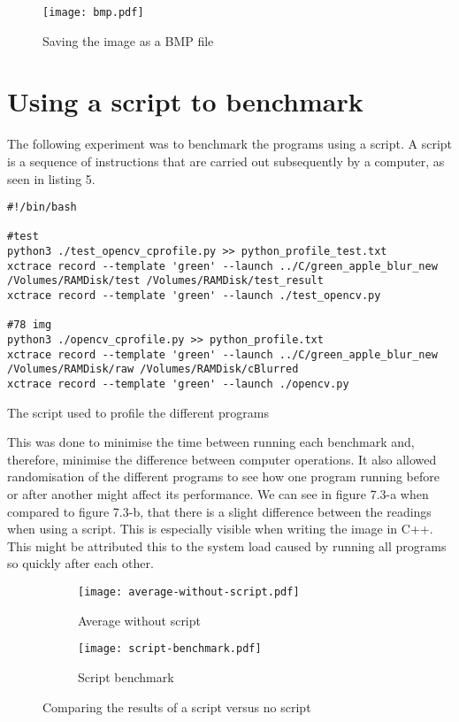 \begin{figure}[H]
	\centering
	\texttt{[image: bmp.pdf]}
	\caption{Saving the image as a BMP file}
	\label{figure:bmp}
\end{figure}

\section{Using a script to benchmark}
The following experiment was to benchmark the programs using a script. A script is a sequence of instructions that are carried out subsequently by a computer, as seen in listing 5.

\begin{listing}[!ht]
	\begin{verbatim}
#!/bin/bash

#test
python3 ./test_opencv_cprofile.py >> python_profile_test.txt
xctrace record --template 'green' --launch ../C/green_apple_blur_new
/Volumes/RAMDisk/test /Volumes/RAMDisk/test_result
xctrace record --template 'green' --launch ./test_opencv.py

#78 img
python3 ./opencv_cprofile.py >> python_profile.txt
xctrace record --template 'green' --launch ../C/green_apple_blur_new
/Volumes/RAMDisk/raw /Volumes/RAMDisk/cBlurred
xctrace record --template 'green' --launch ./opencv.py
	\end{verbatim}
	\caption{The script used to profile the different programs}
	\label{listing:script}
	\end{listing}

This was done to minimise the time between running each benchmark and, therefore, minimise the difference between computer operations. It also allowed randomisation of the different programs to see how one program running before or after another might affect its performance.
We can see in figure 7.3-a when compared to figure 7.3-b, that there is a slight difference between the readings when using a script. This is especially visible when writing the image in C++. This might be attributed this to the system load caused by running all programs so quickly after each other.

\begin{figure}[H]
	\centering
	\begin{subfigure}{.5\textwidth}
	  \centering
	  \texttt{[image: average-without-script.pdf]}
	  \caption{Average without script}
	  \label{fig:no-script}
	\end{subfigure}%
	\begin{subfigure}{.5\textwidth}
	  \centering
	  \texttt{[image: script-benchmark.pdf]}
	  \caption{Script benchmark}
	  \label{fig:script}
	\end{subfigure}
	\caption{Comparing the results of a script versus no script}
	\label{fig:script-vs-noscript}
\end{figure}

